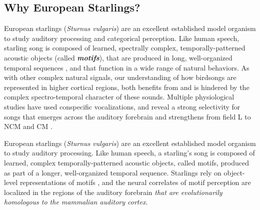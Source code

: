 \subsection{Why European Starlings?}

European starlings ({\it Sturnus vulgaris}) are an excellent established model organism to study auditory processing and  categorical perception. Like human speech, starling song is composed of learned, spectrally complex, temporally-patterned acoustic objects (called \textit{\textbf{motifs}}), that are produced in long, well-organized temporal sequences \cite{gentner2003neuronal}, and that function in a wide range of natural behaviors. As with other complex natural signals, our understanding of how birdsongs are represented in higher cortical regions, both benefits from and is hindered by the complex spectro-temporal character of these sounds. Multiple physiological studies have used conspecific vocalizations, and reveal a strong selectivity for songs that emerges across the auditory forebrain and strengthens from field L to \ac{NCM} and \ac{CM} \cite{gentner2003neuronal, gentner2004neural, thompson2010song, jeanne2011emergence}.

European starlings (\textit{Sturnus vulgaris}) are an excellent established model organism to study auditory processing. Like human speech, a starling's song is composed of learned, complex temporally-patterned acoustic objects, called motifs, produced as part of a longer, well-organized temporal sequence\cite{gentner2003neuronal}. Starlings rely on object-level representations of motifs \cite{Meliza2010,p03702,Comins2013,comins2014auditory}, and the neural correlates of motif perception are localized in the regions of the auditory forebrain \emph{that are evolutionarily homologous to the mammalian auditory cortex\cite{wang2010laminar}}. 

